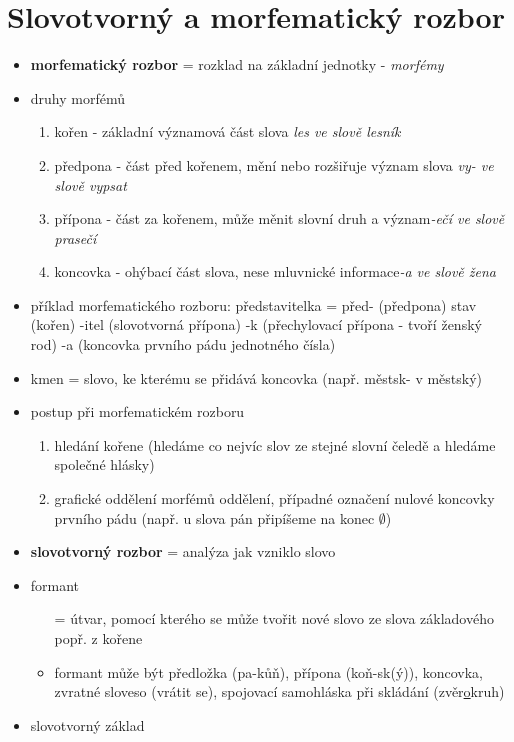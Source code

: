 \documentclass{memoir}
\begin{document}
\section*{Slovotvorný a morfematický rozbor}
\begin{itemize}
	\item \textbf{morfematický rozbor} = rozklad na základní jednotky - \textit{morfémy}
	\item druhy morfémů
	\begin{enumerate}
		\item kořen - základní významová část slova \hfill\textit{les ve slově lesník}
		\item předpona - část před kořenem, mění nebo rozšiřuje význam slova \hfill\textit{vy- ve slově vypsat}
		\item přípona - část za kořenem, může měnit slovní druh a význam\hfill\textit{-ečí ve slově prasečí}
		\item koncovka - ohýbací část slova, nese mluvnické informace\hfill\textit{-a ve slově žena}
	\end{enumerate}
	\item příklad morfematického rozboru: představitelka = před- (předpona) stav (kořen) -itel (slovotvorná přípona) -k (přechylovací přípona - tvoří ženský rod) -a (koncovka prvního pádu jednotného čísla)
	\item kmen = slovo, ke kterému se přidává koncovka (např. městsk- v městský)
	\item postup při morfematickém rozboru
	\begin{enumerate}
		\item hledání kořene (hledáme co nejvíc slov ze stejné slovní čeledě a hledáme společné hlásky)
		\item grafické oddělení morfémů oddělení, případné označení nulové koncovky prvního pádu (např. u slova pán připíšeme na konec $\emptyset$)
	\end{enumerate}
	\item \textbf{slovotvorný rozbor} = analýza jak vzniklo slovo
	\item formant 
	\begin{itemize}
		\item[=] útvar, pomocí kterého se může tvořit nové slovo ze slova základového popř. z kořene
		\item formant může být předložka (pa-kůň), přípona (koň-sk(ý)), koncovka, zvratné sloveso (vrátit se), spojovací samohláska při skládání (zvěr\underline{o}kruh) 
	\end{itemize}
	\item slovotvorný základ 

\end{itemize}
\end{document}
